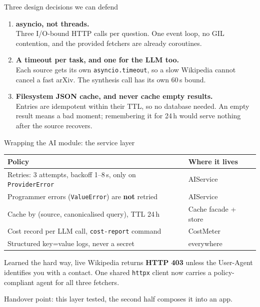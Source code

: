 \documentclass[aspectratio=169,10pt]{beamer}
\begin{document}
\begin{frame}{Three design decisions we can defend}
  \begin{enumerate}\setlength\itemsep{0.8em}
    \item \textbf{asyncio, not threads.}\\
      Three I/O-bound HTTP calls per question. One event loop, no GIL contention,
      and the provided fetchers are already coroutines.
    \item \textbf{A timeout per task, and one for the LLM too.}\\
      Each source gets its own \texttt{asyncio.timeout}, so a slow Wikipedia cannot
      cancel a fast arXiv. The synthesis call has its own 60\,s bound.
    \item \textbf{Filesystem JSON cache, and never cache empty results.}\\
      Entries are idempotent within their TTL, so no database needed. An empty
      result means a bad moment; remembering it for 24\,h would serve nothing
      after the source recovers.
  \end{enumerate}
\end{frame}

\begin{frame}{Wrapping the AI module: the service layer}
  \centering
  \begin{tabular}{ll}
    \toprule
    \textbf{Policy} & \textbf{Where it lives} \\
    \midrule
    Retries: 3 attempts, backoff 1--8\,s, only on \texttt{ProviderError} & AIService \\
    Programmer errors (\texttt{ValueError}) are \textbf{not} retried & AIService \\
    Cache by (source, canonicalised query), TTL 24\,h & Cache facade + store \\
    Cost record per LLM call, \texttt{cost-report} command & CostMeter \\
    Structured key=value logs, never a secret & everywhere \\
    \bottomrule
  \end{tabular}

  \vspace{1.0em}
  \begin{block}{Learned the hard way, live}
    Wikipedia returns \textbf{HTTP 403} unless the User-Agent identifies you with a
    contact. One shared \texttt{httpx} client now carries a policy-compliant agent
    for all three fetchers.
  \end{block}

  \vspace{0.4em}
  {\footnotesize Handover point: this layer tested, the second half composes it into an app.}
\end{frame}
\end{document}
